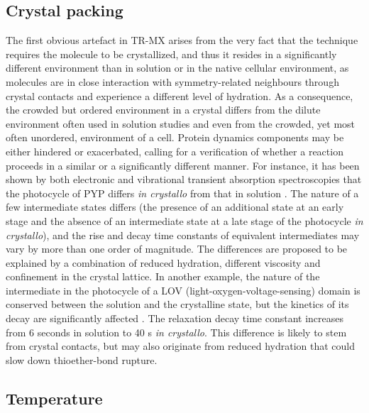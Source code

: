 \subsection{Crystal packing}\label{sec:packingartefact}
The first obvious artefact in TR-MX arises from the very fact that the technique requires the molecule to be crystallized, and thus it resides in a significantly different environment than in solution or in the native cellular environment, as molecules are in close interaction with symmetry-related neighbours through crystal contacts and experience a different level of hydration. As a consequence, the crowded but ordered environment in a crystal differs from the dilute environment often used in solution studies and even from the crowded, yet most often unordered, environment of a cell. Protein dynamics components may be either hindered or exacerbated, calling for a verification of whether a reaction proceeds in a similar or a significantly different manner. For instance, it has been shown by both electronic and vibrational transient absorption spectroscopies that the photocycle of PYP differs \textit{in crystallo} from that in solution \parencite{konoldConfinementCrystalLattice2020}. The nature of a few intermediate states differs (the presence of an additional state at an early stage and the absence of an intermediate state at a late stage of the photocycle \textit{in crystallo}), and the rise and decay time constants of equivalent intermediates may vary by more than one order of magnitude. The differences are proposed to be explained by a combination of reduced hydration, different viscosity and confinement in the crystal lattice. In another example, the nature of the intermediate in the photocycle of a LOV (light-oxygen-voltage-sensing) domain is conserved between the solution and the crystalline state, but the kinetics of its decay are significantly affected \parencite{aumonierSlowProteinDynamics2022}. The relaxation decay time constant increases from 6 seconds in solution to 40 s \textit{in crystallo}. This difference is likely to stem from crystal contacts, but may also originate from reduced hydration that could slow down thioether-bond rupture.

\subsection{Temperature}

